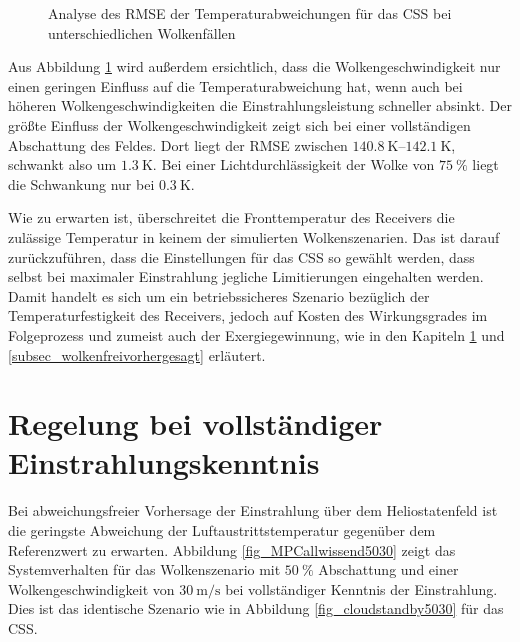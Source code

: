 \begin{figure}[h!]
    \centering
    \setlength{\fboxsep}{1pt}
    \setlength{\fboxrule}{1pt}
\caption[Analyse des RMSE der Temperaturabweichungen für das CSS bei unterschiedlichen Wolkenfällen]{Analyse des RMSE der Temperaturabweichungen für das CSS bei unterschiedlichen Wolkenfällen}
    \label{fig_RMSEcloudstandby}
\end{figure}

Aus Abbildung \ref{fig_RMSEcloudstandby} wird außerdem ersichtlich, dass die Wolkengeschwindigkeit nur einen geringen Einfluss auf die Temperaturabweichung hat, wenn auch bei höheren Wolkengeschwindigkeiten die Einstrahlungsleistung schneller absinkt.
Der größte Einfluss der Wolkengeschwindigkeit zeigt sich bei einer vollständigen Abschattung des Feldes.
Dort liegt der RMSE zwischen $\SIrange{140.8}{142.1}{\kelvin}$, schwankt also um $\SI{1.3}{\kelvin}$.
Bei einer Lichtdurchlässigkeit der Wolke von $\SI{75}{\percent}$ liegt die Schwankung nur bei $\SI{0.3}{\kelvin}$.

Wie zu erwarten ist, überschreitet die Fronttemperatur des Receivers die zulässige Temperatur in keinem der simulierten Wolkenszenarien.
Das ist darauf zurückzuführen, dass die Einstellungen für das CSS so gewählt werden, dass selbst bei maximaler Einstrahlung jegliche Limitierungen eingehalten werden.
Damit handelt es sich um ein betriebssicheres Szenario bezüglich der Temperaturfestigkeit des Receivers, jedoch auf Kosten des Wirkungsgrades im Folgeprozess und zumeist auch der Exergiegewinnung, wie in den Kapiteln \ref{sec_AllwissendeMPC} und \ref{subsec_wolkenfreivorhergesagt} erläutert.


\section{Regelung bei vollständiger Einstrahlungskenntnis} \label{sec_AllwissendeMPC}
Bei abweichungsfreier Vorhersage der Einstrahlung über dem Heliostatenfeld ist die geringste Abweichung der Luftaustrittstemperatur gegenüber dem Referenzwert zu erwarten.
Abbildung \ref{fig_MPCallwissend5030} zeigt das Systemverhalten für das Wolkenszenario mit $\SI{50}{\percent}$ Abschattung und einer Wolkengeschwindigkeit von $\SI{30}{\metre\per\second}$ bei vollständiger Kenntnis der Einstrahlung.
Dies ist das identische Szenario wie in Abbildung \ref{fig_cloudstandby5030} für das CSS.

